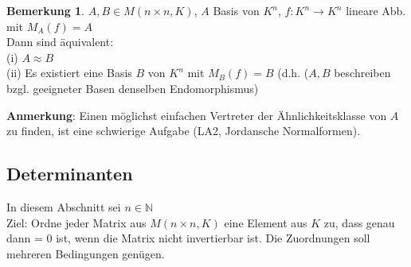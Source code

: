 \documentclass[10pt,a4paper,numbers=endperiod]{scrartcl}
\theoremstyle{definition}
\newtheorem{bem}[satz]{Bemerkung}
\def\NN{{\mathbb N}}
\begin{document}
\begin{bem}
	$A,B \in M(n \times n,K)$, $A$ Basis von $K^n$, $f:K^n \rightarrow K^n$ lineare Abb. mit $M_A(f) = A$\\
	Dann sind äquivalent:\\
	(i) $A \approx B$\\
	(ii) Es existiert eine Basis $B$ von $K^n$ mit $M_B(f) = B$ (d.h. ($A,B$ beschreiben bzgl. geeigneter Basen denselben Endomorphismus)
\end{bem}

\textbf{Anmerkung}: Einen möglichst einfachen Vertreter der Ähnlichkeitsklasse von $A$ zu finden, ist eine schwierige Aufgabe (LA2, Jordansche Normalformen).

\subsection{Determinanten}
In diesem Abschnitt sei $n \in \NN$\\
Ziel: Ordne jeder Matrix aus $M(n \times n,K)$ eine Element aus $K$ zu, dass genau dann = 0 ist, wenn die Matrix nicht invertierbar ist. Die Zuordnungen soll mehreren Bedingungen genügen.
\end{document}
